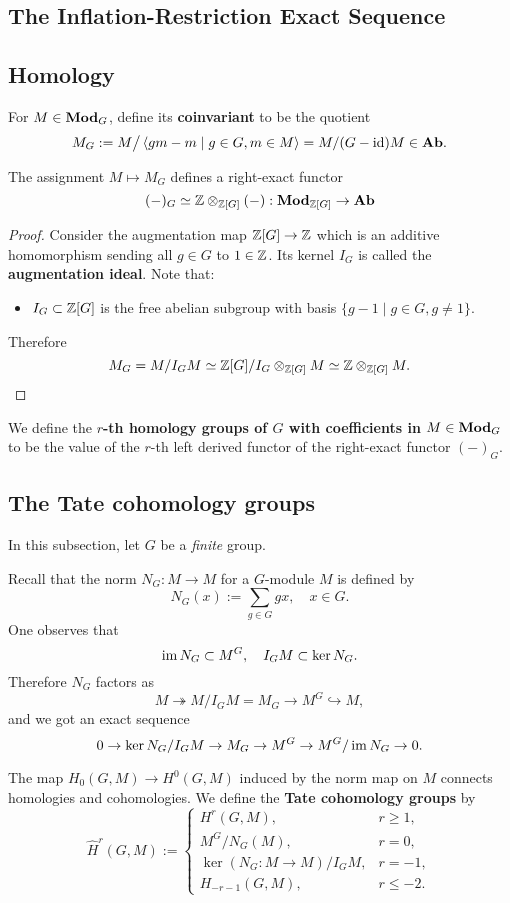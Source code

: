 \subsection{The Inflation-Restriction Exact Sequence}



\subsection{Homology}

For $M\in \mathbf{Mod}_G$, define its \textbf{coinvariant} to be the quotient
\[M_G := M\big/ \left\langle gm - m\mid g\in G, m\in M \right\rangle = M/(G - \operatorname{id})M\in \mathbf{Ab}.\]

\begin{lemma}
    The assignment $M\mapsto M_G$ defines a right-exact functor \[(-)_G\simeq \mathbb{Z}\otimes_{\mathbb{Z}[G]}(-) : \mathbf{Mod}_{\mathbb{Z}[G]}\to\mathbf{Ab}\]
\end{lemma}
\begin{proof}
Consider the augmentation map $\mathbb{Z}[G]\to\mathbb{Z}$ which is an additive homomorphism sending all $g\in G$ to $1\in\mathbb{Z}$.
Its kernel $I_G$ is called the \textbf{augmentation ideal}.
Note that:\begin{itemize}
    \item $I_G\subset\mathbb{Z}[G]$ is the free abelian subgroup with basis $\{g - 1 \mid g\in G, g\ne 1\}$.
\end{itemize}
Therefore \[M_G = M/I_GM\simeq \mathbb{Z}[G]/I_G\otimes_{\mathbb{Z}[G]} M\simeq \mathbb{Z}\otimes_{\mathbb{Z}[G]} M.\qedhere\]
\end{proof}
We define the \textbf{$r$-th homology groups of $G$ with coefficients in $M\in\mathbf{Mod}_G$} to be the value of the $r$-th left derived functor of the right-exact functor $(-)_G$.

\subsection{The Tate cohomology groups}

In this subsection, let $G$ be a \textit{finite} group.

Recall that the norm $N_G : M \to M$ for a $G$-module $M$ is defined by \[N_G(x) := \sum_{g\in G}gx,\quad x\in G.\]
One observes that \[\operatorname{im} N_G\subset M^G,\quad I_GM\subset \ker N_G.\]
Therefore $N_G$ factors as \[M\twoheadrightarrow M/I_GM = M_G\to M^G\hookrightarrow M,\] and we got an exact sequence \[0\to\ker N_G/I_GM\to M_G\to M^G\to M^G/\operatorname{im} N_G\to 0.\]

The map $H_0(G, M)\to H^0(G, M)$ induced by the norm map on $M$ connects homologies and cohomologies. We define the \textbf{Tate cohomology groups} by \[\hat H^r (G, M) := \begin{cases}
    H^r(G, M), &r\ge 1,\\
    M^G/N_G(M), &r = 0,\\
    \ker (N_G : M\to M)/I_GM, & r = -1,\\
    H_{-r-1} (G, M), & r\le -2.
\end{cases}\]

